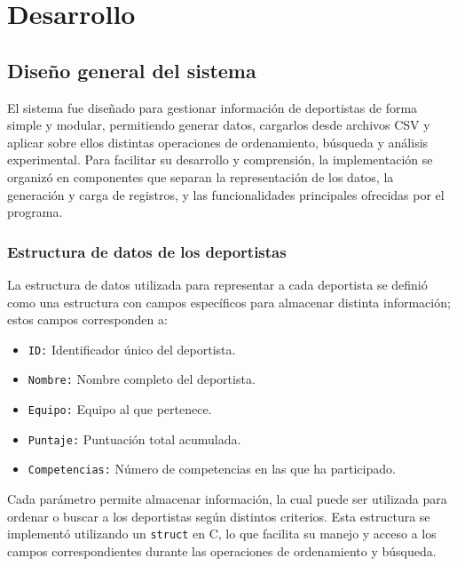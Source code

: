 \chapter{Desarrollo}

\section{Diseño general del sistema}
El sistema fue diseñado para gestionar información de deportistas de forma simple y modular, permitiendo generar datos, cargarlos desde archivos CSV y aplicar sobre ellos distintas operaciones de ordenamiento, búsqueda y análisis experimental. Para facilitar su desarrollo y comprensión, la implementación se organizó en componentes que separan la representación de los datos, la generación y carga de registros, y las funcionalidades principales ofrecidas por el programa.
\subsection{Estructura de datos de los deportistas}
La estructura de datos utilizada para representar a cada deportista se definió como una estructura con campos específicos para almacenar distinta información; estos campos corresponden a:
\begin{itemize}
    \item \texttt{ID:} Identificador único del deportista.
    \item \texttt{Nombre:} Nombre completo del deportista.
    \item \texttt{Equipo:} Equipo al que pertenece.
    \item \texttt{Puntaje:} Puntuación total acumulada.
    \item \texttt{Competencias:} Número de competencias en las que ha participado.
\end{itemize}
Cada parámetro permite almacenar información, la cual puede ser utilizada para ordenar o buscar a los deportistas según distintos criterios. Esta estructura se implementó utilizando un \texttt{struct} en C, lo que facilita su manejo y acceso a los campos correspondientes durante las operaciones de ordenamiento y búsqueda.

